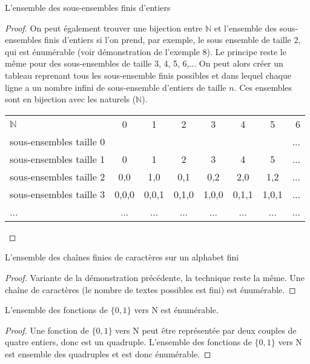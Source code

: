 \begin{myexem}  
  L'ensemble des sous-ensembles finis d'entiers
  \begin{proof}
  On peut également trouver une bijection entre $\mathbb{N}$ et l'ensemble des sous-ensembles finis d'entiers si l'on prend, par exemple, le sous ensemble de taille 2, qui est énumérable (voir démonstration de l'exemple 8). Le principe reste le même pour des sous-ensembles de taille 3, 4, 5, 6,... On peut alors créer un tableau reprenant tous les sous-ensemble finis possibles et dans lequel chaque ligne a un nombre infini de sous-ensemble d'entiers de taille $n$. Ces ensembles sont en bijection avec les naturels ($\mathbb{N}$).
  
  
    \begin{tabular}{ l c c  c  c c c  r }
 	 $\mathbb{N}$ & 0 & 1 & 2  & 3 & 4 & 5 & 6  \\
 	 sous-ensembles  taille 0  & {} & {} & {} & {} & {} & {}  & ... \\
 	 sous-ensembles  taille 1   & {0} & {1} & {2} & {3} & {4} & {5} & ... \\
 	 sous-ensembles  taille 2  & {0,0} & {1,0} & {0,1} & {0,2} & {2,0} & {1,2}  & ... \\
 	 sous-ensembles  taille 3  & {0,0,0} & {0,0,1} & {0,1,0} & {1,0,0} & {0,1,1} & {1,0,1}  & ... \\
 	  ...  & {...} & {...} & {...} & {...} & {...} & {...}  & ... \\
 	 
	\end{tabular}
  \end{proof}
\end{myexem}

\begin{myexem}  
  L'ensemble des chaînes finies de caractères sur un alphabet fini
\begin{proof}
 Variante de la démonstration précédente, la technique reste la même. Une chaîne de caractères (le nombre de textes possibles est fini) est énumérable.  
\end{proof}
\end{myexem}

\begin{myexem}
 L'ensemble des fonctions de  $\{0, 1\}$ vers N est énumérable.
 \begin{proof}
  Une fonction de $\{0, 1\}$ vers N peut être représentée par deux couples de quatre entiers, donc est un quadruple. L'ensemble des fonctions de $\{0, 1\}$ vers N est ensemble des quadruples et est donc énumérable.
 \end{proof}
\end{myexem}
 
